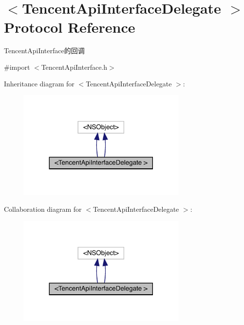 \hypertarget{protocol_tencent_api_interface_delegate_01-p}{}\section{$<$Tencent\+Api\+Interface\+Delegate $>$ Protocol Reference}
\label{protocol_tencent_api_interface_delegate_01-p}


Tencent\+Api\+Interface的回调  




{\ttfamily \#import $<$Tencent\+Api\+Interface.\+h$>$}



Inheritance diagram for $<$Tencent\+Api\+Interface\+Delegate $>$\+:\nopagebreak
\begin{figure}[H]
\begin{center}
\leavevmode
\includegraphics[width=239pt]{protocol_tencent_api_interface_delegate_01-p__inherit__graph}
\end{center}
\end{figure}


Collaboration diagram for $<$Tencent\+Api\+Interface\+Delegate $>$\+:\nopagebreak
\begin{figure}[H]
\begin{center}
\leavevmode
\includegraphics[width=239pt]{protocol_tencent_api_interface_delegate_01-p__coll__graph}
\end{center}
\end{figure}
